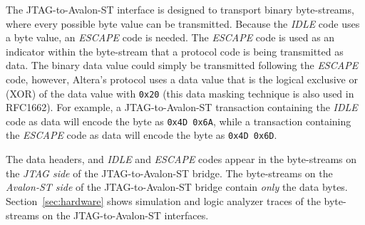 \documentclass[10pt,twoside]{article}
\begin{document}
The JTAG-to-Avalon-ST interface is designed to transport binary
byte-streams, where every possible byte value can be transmitted.
Because the {\em IDLE} code uses a byte value, an {\em ESCAPE} 
code is needed. The {\em ESCAPE} code is used as an indicator 
within the byte-stream that a protocol code is being transmitted as data. 
The binary data value could simply be transmitted following the
{\em ESCAPE} code, however, Altera's protocol uses a data value
that is the logical exclusive or (XOR) of the data value with
\verb+0x20+ (this data masking technique is also
used in RFC1662\cite{RFC1662_1994}).
%
For example, a JTAG-to-Avalon-ST transaction containing the {\em IDLE}
code as data will encode the byte as \verb+0x4D 0x6A+,
while a transaction containing the {\em ESCAPE} code as data will
encode the byte as \verb+0x4D 0x6D+.

The data headers, and {\em IDLE} and {\em ESCAPE} codes appear in the
byte-streams on the {\em JTAG side} of the JTAG-to-Avalon-ST bridge.
The byte-streams on the {\em Avalon-ST side} of the JTAG-to-Avalon-ST bridge
contain {\em only} the data bytes. Section~\ref{sec:hardware}
shows simulation and logic analyzer traces of the byte-streams
on the JTAG-to-Avalon-ST interfaces.
\end{document}
